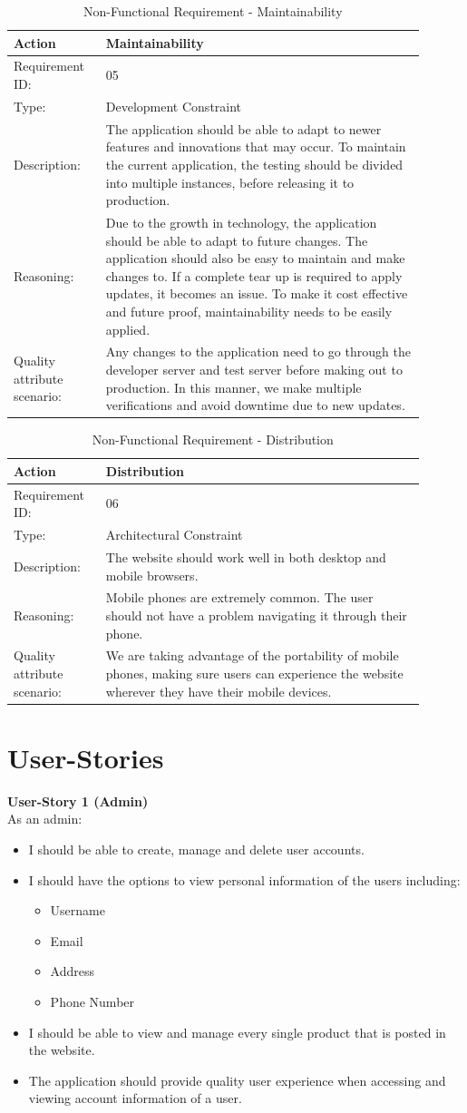 \documentclass[11pt]{article}
\newcounter{use case ID}
\newcommand\addrow[2]{#1 & #2\\ \hline}
\newcounter{req ID}
\newcommand\tabularheadfsd[1]{
            \begin{table}[ht]
                \addtocounter{req ID}{1}
                \caption{Non-Functional Requirement \arabic{req ID} - #1}
                \vspace{0.2cm}
                \begin{tabular}{|p{0.2\linewidth}|p{0.70\linewidth}|}
                    \hline
                    \textbf{Action} & \textbf{#1} \\
                    \hline}
\newenvironment{requirement}{\tabularheadfsd}
                {\hline\end{tabular}\end{table}}
\begin{document}
\begin{requirement}{Maintainability}
    \addrow{Requirement ID:}{05}
    \addrow{Type:}{Development Constraint}
    \addrow{Description:}{The application should be able to adapt to newer features and innovations that may occur. To maintain the current application, the testing should be divided into multiple instances, before releasing it to production.}
    \addrow{Reasoning:}{Due to the growth in technology, the application should be able to adapt to future changes. The application should also be easy to maintain and make changes to. If a complete tear up is required to apply updates, it becomes an issue. To make it cost effective and future proof, maintainability needs to be easily applied.}
    \addrow{Quality attribute scenario:}{Any changes to the application need to go through the developer server and test server before making out to production. In this manner, we make multiple verifications and avoid downtime due to new updates.}
\end{requirement}

\begin{requirement}{Distribution}
    \addrow{Requirement ID:}{06}
    \addrow{Type:}{Architectural Constraint}
    \addrow{Description:}{The website should work well in both desktop and mobile browsers.}
    \addrow{Reasoning:}{Mobile phones are extremely common. The user should not have a problem navigating it through their phone.}
    \addrow{Quality attribute scenario:}{We are taking advantage of the portability of mobile phones, making sure users can experience the website wherever they have their mobile devices.}
\end{requirement}

\clearpage

\section{User-Stories}

\textbf{User-Story 1 (Admin)} \\
As an admin:
\begin{itemize}
   \item I should be able to create, manage and delete user accounts.
    \item I should have the options to view personal information of the users including:
        \begin{itemize}
            \item Username
            \item Email
            \item Address
            \item Phone Number
        \end{itemize}
    \item I should be able to view and manage every single product that is posted in the website.
    \item The application should provide quality user experience when accessing and viewing account information of a user.
\end{itemize}
\end{document}
